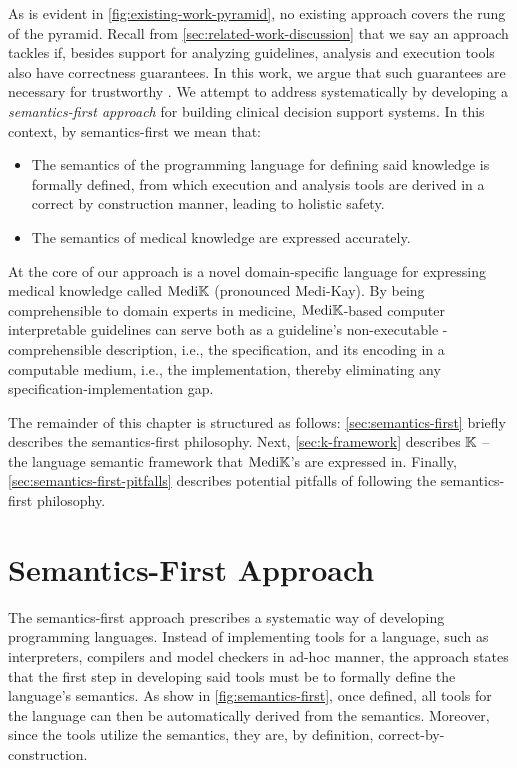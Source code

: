 As is evident in \autoref{fig:existing-work-pyramid}, no
existing approach covers the  rung of the pyramid.
Recall from \autoref{sec:related-work-discussion} that we say an
approach tackles  if,
besides support for analyzing guidelines,
analysis and execution tools also have correctness guarantees.
In this work, we argue that such guarantees are necessary for
trustworthy \CDSSs{}. We attempt to address 
systematically by developing a \emph{semantics-first approach} for
building clinical decision support systems. In this context, by semantics-first
we mean that:
\begin{itemize}
  \item The semantics of the programming language for defining said knowledge is
    formally defined, from which execution and analysis tools are derived in a
    correct by construction manner, leading to holistic safety.
  \item The semantics of medical knowledge are expressed accurately.
\end{itemize}
At the core of our approach is a novel domain-specific language for expressing
medical knowledge called $\text{Medi}\mathbb{K}{}{}$ (pronounced Medi-Kay). By being comprehensible to domain experts
in medicine, $\text{Medi}\mathbb{K}{}{}$-based computer interpretable guidelines can serve
both as a guideline's non-executable \HCP{}-comprehensible description, i.e.,
the specification, and its encoding in a computable medium, i.e., the
implementation, thereby eliminating any specification-implementation gap.

The remainder of this chapter is structured as follows:
\autoref{sec:semantics-first} briefly describes the semantics-first philosophy.
Next, \autoref{sec:k-framework} describes $\mathbb{K}$ -- the language semantic
framework that $\text{Medi}\mathbb{K}{}{}$'s are expressed in. Finally,
\autoref{sec:semantics-first-pitfalls} describes potential pitfalls
of following the semantics-first philosophy.

\section{Semantics-First Approach}\label{sec:semantics-first}

The semantics-first approach prescribes a systematic way of
developing programming languages. Instead of implementing
tools for a language, such as interpreters, compilers and
model checkers in ad-hoc manner, the approach states that the
first step in developing said tools must be to formally define
the language's semantics. As show in \autoref{fig:semantics-first},
once defined, all tools for the language
can then be automatically derived from the semantics. Moreover, since
the tools utilize the semantics, they are, by definition,
correct-by-construction.

